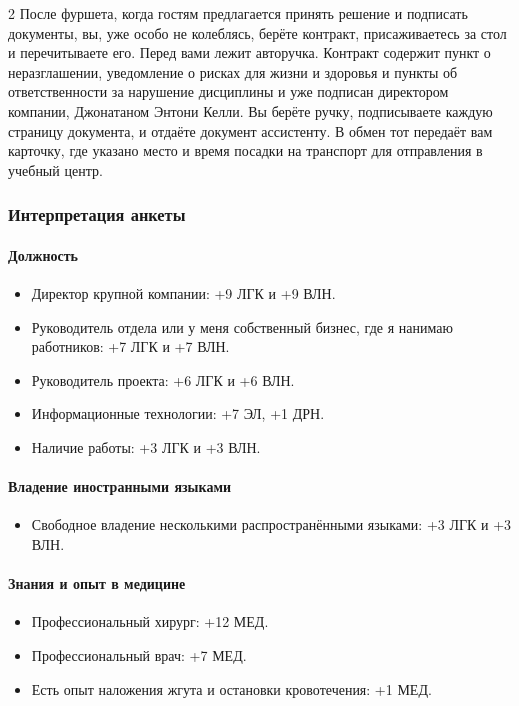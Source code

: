\documentclass[twoside]{article}
\begin{document}
\begin{multicols}{2}
После фуршета, когда гостям предлагается принять решение и подписать
документы, вы, уже особо не колеблясь, берёте контракт, присаживаетесь
за стол и перечитываете его. Перед вами лежит авторучка. Контракт
содержит пункт о неразглашении, уведомление о рисках для жизни и
здоровья и пункты об ответственности за нарушение дисциплины и уже
подписан директором компании, Джонатаном Энтони Келли. Вы берёте ручку,
подписываете каждую страницу документа, и отдаёте документ ассистенту. В
обмен тот передаёт вам карточку, где указано место и время посадки на
транспорт для отправления в учебный центр.

\subsubsection{Интерпретация анкеты}\label{questionnaire-interpretation}

\paragraph{Должность}\label{position}

\begin{itemize}
\item
  Директор крупной компании: +9 ЛГК и +9 ВЛН.
\item
  Руководитель отдела или у меня собственный бизнес, где я нанимаю
  работников: +7 ЛГК и +7 ВЛН.
\item
  Руководитель проекта: +6 ЛГК и +6 ВЛН.
\item
  Информационные технологии: +7 ЭЛ, +1 ДРН.
\item
  Наличие работы: +3 ЛГК и +3 ВЛН.
\end{itemize}

\paragraph{Владение иностранными языками}\label{languages}

\begin{itemize}
\item
  Свободное владение несколькими распространёнными языками: +3 ЛГК и +3 ВЛН.
\end{itemize}

\paragraph{Знания и опыт в медицине}\label{medical-experience}

\begin{itemize}
\item
  Профессиональный хирург: +12 МЕД.
\item
  Профессиональный врач: +7 МЕД.
\item
  Есть опыт наложения жгута и остановки кровотечения: +1 МЕД.
\end{itemize}


\end{multicols}
\end{document}
